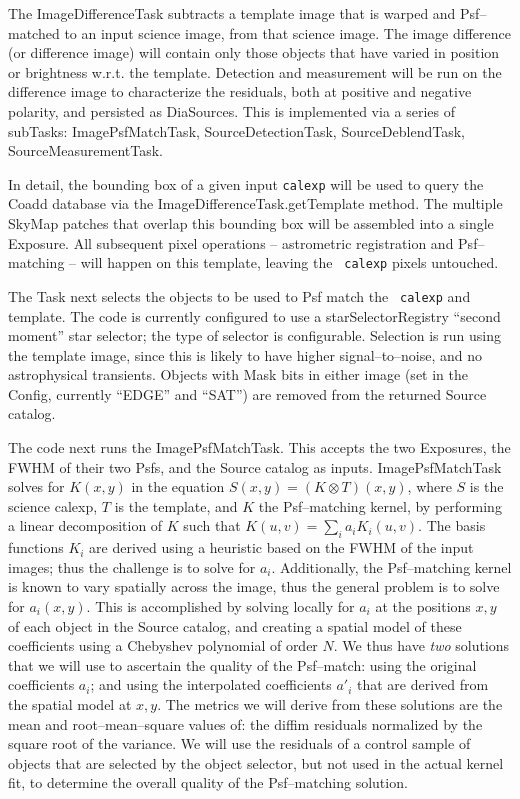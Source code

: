 \documentclass[prd, nofootinbib, floatfix, 11pt,tightenlines,times]{article}
\begin{document}
The ImageDifferenceTask subtracts a template image that is
warped and Psf--matched to an input science image, from that science image.  The
image difference (or difference image) will contain only those objects
that have varied in position or brightness w.r.t. the template.
Detection and measurement will be run on the difference image to
characterize the residuals, both at positive and negative polarity,
and persisted as DiaSources.  This is implemented via a series of
subTasks: ImagePsfMatchTask, SourceDetectionTask, SourceDeblendTask,
SourceMeasurementTask.

In detail, the bounding box of a given input {\tt calexp} will be used
to query the Coadd database via the ImageDifferenceTask.getTemplate
method.  The multiple SkyMap patches that overlap this bounding box
will be assembled into a single Exposure.  All
subsequent pixel operations -- astrometric registration and
Psf--matching -- will happen on this template, leaving the {\tt
  calexp} pixels untouched.  

The Task next selects the objects to be used to Psf match the {\tt
  calexp} and template.  The code is currently configured to use a
starSelectorRegistry ``second moment'' star selector; the type of selector is configurable.  
Selection is run using the template image,
since this is likely to have higher signal--to--noise, and no
astrophysical transients.  Objects with Mask
bits in either image (set in the Config, currently ``EDGE'' and
``SAT'') are removed from the returned Source catalog.

The code next runs the ImagePsfMatchTask.  This accepts the two
Exposures, the FWHM of their two Psfs, and the Source catalog as
inputs.  ImagePsfMatchTask solves for $K(x,y)$ in the
equation $S(x,y) = (K \otimes T)(x,y)$, where $S$ is the science
calexp, $T$ is the template, and $K$ the Psf--matching kernel, by
performing a linear decomposition of $K$ such that $K(u,v) = \sum_i
a_i K_i(u,v)$.  The basis functions $K_i$ are derived using a
heuristic based on the FWHM of the input images; thus the challenge is to solve for $a_i$.
Additionally, the Psf--matching kernel is known to vary spatially
across the image, thus the general problem is to solve for $a_i(x,y)$.
This is accomplished by solving locally for $a_i$ at the positions
$x,y$ of each object in the Source catalog, and creating a spatial
model of these coefficients using a Chebyshev polynomial of order $N$.
We thus have {\it two} solutions that we will use to ascertain the
quality of the Psf--match: using the original coefficients $a_i$; and
using the interpolated coefficients $a{'}_i$ that are derived from the
spatial model at $x,y$.  The metrics we will derive from these
solutions are the mean and root--mean--square values of: the diffim
residuals normalized by the square root of the variance.  We will use
the residuals of a control sample of objects that are selected by the
object selector, but not used in the actual kernel fit, to determine
the overall quality of the Psf--matching solution.
\end{document}
